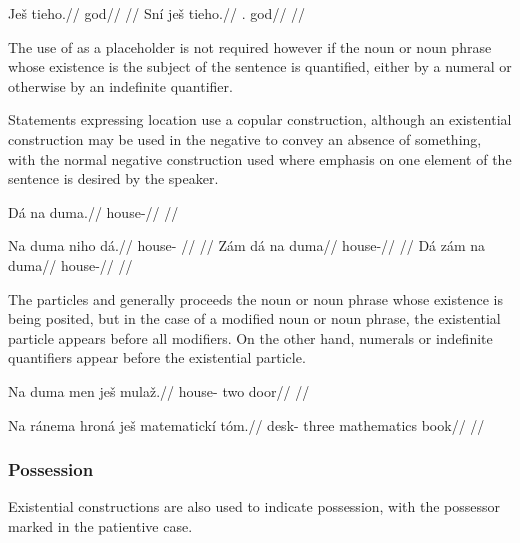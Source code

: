 \begin{multicols}{2}
\pex
\a\begingl
\gla \ljudge{*}Ješ tieho.//
\glb \Exst{} god//
\glft {}//
\endgl
\a\begingl
\gla Sní ješ tieho.//
\glb \Refl{}.\Acc{} \Exst{} god//
\glft {}//
\endgl
\xe
\end{multicols}

The use of  as a placeholder is not required however if the noun or
noun phrase whose existence is the subject of the sentence is quantified, either
by a numeral or otherwise by an indefinite quantifier.

Statements expressing location use a copular construction, although an
existential construction may be used in the negative to convey an absence of
something, with the normal negative construction used where emphasis on one
element of the sentence is desired by the speaker.

\pex
\begingl
\gla Dá na duma.//
\glb \First{}\Sg{} \Loc{} house-\Acc{}//
\glft {}//
\endgl
\xe

\pex
\a\begingl
\gla Na duma niho dá.//
\glb \Loc{} house-\Acc{} \N{}\Exst{} \First{}\Sg{}//
\glft {}//
\endgl
\a\begingl
\gla Zám dá na duma//
\glb \Neg{} \First{}\Sg{} \Loc{} house-\Acc{}//
\glft {}//
\endgl
\a\begingl
\gla Dá zám na duma//
\glb \First{}\Sg{} \Neg{} \Loc{} house-\Acc{}//
\glft {}//
\endgl
\xe

The particles  and  generally proceeds the noun or noun
phrase whose existence is being posited, but in the case of a modified noun or
noun phrase, the existential particle appears before all modifiers. On the other
hand, numerals or indefinite quantifiers appear before the existential particle.

\pex
\begingl
\gla Na duma men ješ mulaž.//
\glb \Loc{} house-\Acc{} two \Exst{} door//
\glft {}//
\endgl
\xe

\pex
\begingl
\gla Na ránema hroná ješ matematickí tóm.//
\glb \Loc{} desk-\Acc{} three \Exst{} mathematics book//
\glft {}//
\endgl
\xe




\subsubsection{Possession}
Existential constructions are also used to indicate possession, with the
possessor marked in the patientive case.

